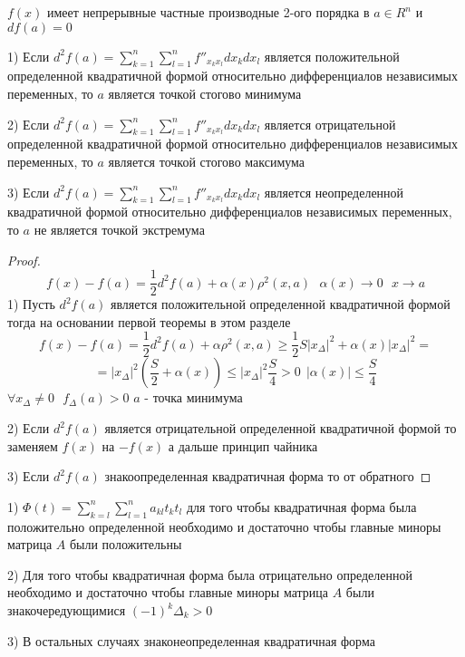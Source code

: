 \begin{theorem}
  $f(x)$ имеет непрерывные частные производные 2-ого порядка в $a \in R^n$ и
  $df(a) = 0$

  1) Если $d^2 f(a) = \sum_{k=1}^n \sum_{l=1}^n f''_{x_k x_l} dx_k dx_l$
  является положительной определенной квадратичной формой относительно
  дифференциалов независимых переменных, то $a$ является точкой стогово
  минимума

  2) Если $d^2 f(a) = \sum_{k=1}^n \sum_{l=1}^n f''_{x_k x_l} dx_k dx_l$
  является отрицательной определенной квадратичной формой относительно
  дифференциалов независимых переменных, то $a$ является точкой стогово
  максимума

  3) Если $d^2 f(a) = \sum_{k=1}^n \sum_{l=1}^n f''_{x_k x_l} dx_k dx_l$
  является неопределенной квадратичной формой относительно
  дифференциалов независимых переменных, то $a$ не является точкой экстремума
\end{theorem}

\begin{proof}
  $$
  f(x) - f(a) = \frac{1}{2}d^2f(a) + \alpha(x) \rho^2(x, a) ~~~
  \alpha(x) \to 0 ~~~ x \to a
  $$
  1) Пусть $d^2f(a)$ является положительной определенной квадратичной формой
  тогда на основании первой теоремы в этом разделе
  $$
  f(x) - f(a) = \frac{1}{2} d^2f(a) + \alpha \rho^2(x, a) \ge \frac{1}{2}
  S|x_{\Delta}|^2 + \alpha(x)|x_{\Delta}|^2 =
  $$
  $$
  = |x_{\Delta}|^2 (\frac{S}{2} + \alpha(x)) \le |x_{\Delta}|^2 \frac{S}{4} > 0
  ~~ |\alpha(x)| \le \frac{S}{4}
  $$
  $\forall x_{\Delta} \not= 0 ~~~ f_{\Delta}(a) > 0$ $a$ - точка минимума

  2) Если $d^2f(a)$ является отрицательной определенной квадратичной формой то
  заменяем $f(x)$ на $-f(x)$ а дальше принцип чайника

  3) Если $d^2 f(a)$ знакоопределенная квадратичная форма то от обратного
\end{proof}

\begin{block}
  1) $\Phi(t) = \sum_{k=l}^n \sum_{l=1}^n a_{kl} t_k t_l$ для того чтобы
  квадратичная форма была положительно определенной необходимо и достаточно
  чтобы главные миноры матрица $A$ были положительны

  2) Для того чтобы квадратичная форма была отрицательно определенной
  необходимо и достаточно чтобы главные миноры матрица $A$ были
  знакочередующимися $(-1)^k \Delta_k > 0$

  3) В остальных случаях знаконеопределенная квадратичная форма
\end{block}

